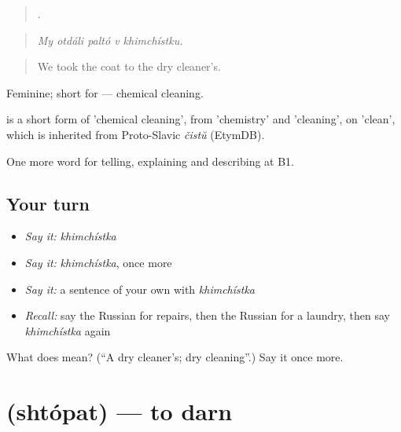 \begin{quote}
    .
\end{quote}

\begin{quote}
\emph{My otdáli paltó v khimchístku.}
\end{quote}

\begin{quote}
We took the coat to the dry cleaner's.
\end{quote}

Feminine; short for \emph{ } — chemical cleaning.

\begin{cousinweb}
\emph{} is a short form of \emph{ } 'chemical cleaning', from \emph{} 'chemistry' and \emph{} 'cleaning', on \emph{} 'clean', which is inherited from Proto-Slavic \emph{čistŭ} (EtymDB).
\end{cousinweb}

\begin{grammarlens}[title={What you've built}]
One more word for telling, explaining and describing at B1.
\end{grammarlens}

\subsection*{Your turn}
\begin{itemize}
\raggedright
  \item \emph{Say it:} \emph{khimchístka}
  \item \emph{Say it:} \emph{khimchístka}, once more
  \item \emph{Say it:} a sentence of your own with \emph{khimchístka}
  \item \emph{Recall:} say the Russian for repairs, then the Russian for a laundry, then say \emph{khimchístka} again
\end{itemize}

\begin{tcolorbox}[breakable,colback=teal!4,colframe=teal!35!black,title={Before you move on}]
What does  mean? (\textquotedblleft{}A dry cleaner's; dry cleaning\textquotedblright{}.) Say it once more.
\end{tcolorbox}
\section[\texorpdfstring{\ru{штопать} (shtópat)}{штопать (shtópat)}]{ (shtópat) — to darn}

